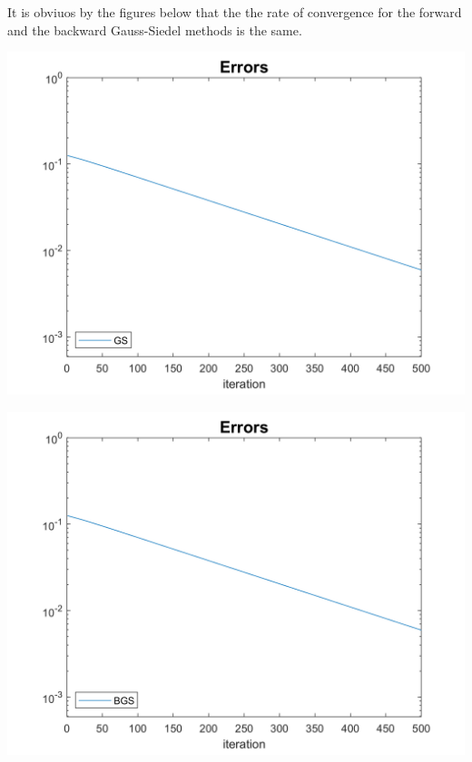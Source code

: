 \begin{solution}
    It is obviuos by the figures below that the the rate of convergence for the forward and the backward
    Gauss-Siedel methods is the same.
    \begin{center}
        \includegraphics[scale=0.2]{gs.PNG}
    \end{center}
    \begin{center}
        \includegraphics[scale=0.2]{bgs.PNG}
    \end{center}

\end{solution}

\newpage

\newpage
